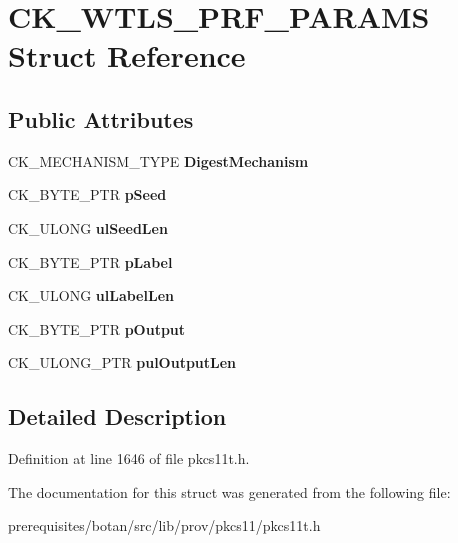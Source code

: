 \hypertarget{struct_c_k___w_t_l_s___p_r_f___p_a_r_a_m_s}{}\section{C\+K\+\_\+\+W\+T\+L\+S\+\_\+\+P\+R\+F\+\_\+\+P\+A\+R\+A\+MS Struct Reference}
\label{struct_c_k___w_t_l_s___p_r_f___p_a_r_a_m_s}
\subsection*{Public Attributes}
\begin{DoxyCompactItemize}
\item 
\mbox{\label{struct_c_k___w_t_l_s___p_r_f___p_a_r_a_m_s_ac6436a02ffb4456ded679269d39d1ff5}} 
C\+K\+\_\+\+M\+E\+C\+H\+A\+N\+I\+S\+M\+\_\+\+T\+Y\+PE {\bfseries Digest\+Mechanism}
\item 
\mbox{\label{struct_c_k___w_t_l_s___p_r_f___p_a_r_a_m_s_a0c3ad364b33803b03e19e5dfdedf3ee5}} 
C\+K\+\_\+\+B\+Y\+T\+E\+\_\+\+P\+TR {\bfseries p\+Seed}
\item 
\mbox{\label{struct_c_k___w_t_l_s___p_r_f___p_a_r_a_m_s_a7d8b97f28c8b840279020456f79dd417}} 
C\+K\+\_\+\+U\+L\+O\+NG {\bfseries ul\+Seed\+Len}
\item 
\mbox{\label{struct_c_k___w_t_l_s___p_r_f___p_a_r_a_m_s_a19db3dcedca6d94414ae8129dcc4d9aa}} 
C\+K\+\_\+\+B\+Y\+T\+E\+\_\+\+P\+TR {\bfseries p\+Label}
\item 
\mbox{\label{struct_c_k___w_t_l_s___p_r_f___p_a_r_a_m_s_a28b6aa5bf2481a161c0da65b03172c65}} 
C\+K\+\_\+\+U\+L\+O\+NG {\bfseries ul\+Label\+Len}
\item 
\mbox{\label{struct_c_k___w_t_l_s___p_r_f___p_a_r_a_m_s_aca999ea8711746cc82ef707e471e692c}} 
C\+K\+\_\+\+B\+Y\+T\+E\+\_\+\+P\+TR {\bfseries p\+Output}
\item 
\mbox{\label{struct_c_k___w_t_l_s___p_r_f___p_a_r_a_m_s_a677fffe2c77dacb51f64e277258a335d}} 
C\+K\+\_\+\+U\+L\+O\+N\+G\+\_\+\+P\+TR {\bfseries pul\+Output\+Len}
\end{DoxyCompactItemize}


\subsection{Detailed Description}


Definition at line 1646 of file pkcs11t.\+h.



The documentation for this struct was generated from the following file\+:\begin{DoxyCompactItemize}
\item 
prerequisites/botan/src/lib/prov/pkcs11/pkcs11t.\+h\end{DoxyCompactItemize}
